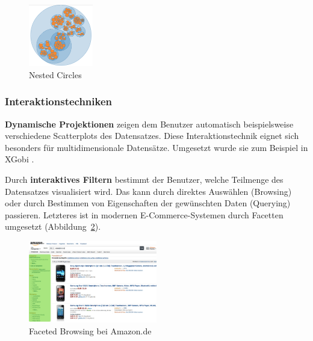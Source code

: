 \documentclass[
	headsepline,
	footsepline,
	fontsize=12pt,
	bibliography=totoc
]{scrbook}
\begin{document}
\begin{figure}[htbp]
   \centering
   \includegraphics[width=0.25\textwidth]{images/grundlagen-nested_circles.png}
   \caption{Nested Circles}
   \label{figure:nested_circles}
\end{figure}

\subsubsection{Interaktionstechniken}
\label{section:interaktionstechniken}


\textbf{Dynamische Projektionen} zeigen dem Benutzer automatisch beispielsweise verschiedene Scatterplots des Datensatzes. Diese Interaktionstechnik eignet sich besonders für multidimensionale Datensätze. Umgesetzt wurde sie zum Beispiel in XGobi \cite{Swayne1998}.


Durch \textbf{interaktives Filtern} bestimmt der Benutzer, welche Teilmenge des Datensatzes visualisiert wird. Das kann durch direktes Auswählen (Browsing) oder durch Bestimmen von Eigenschaften der gewünschten Daten (Querying) passieren. Letzteres ist in modernen E-Commerce-Systemen durch Facetten \cite{Yee2003} umgesetzt (Abbildung~\ref{figure:faceted_browsing}).

\begin{figure}[htbp]
   \centering
   \includegraphics[width=0.5\textwidth]{images/grundlagen-faceted_browsing.png}
   \caption{Faceted Browsing bei Amazon.de}
   \label{figure:faceted_browsing}
\end{figure}

\end{document}
